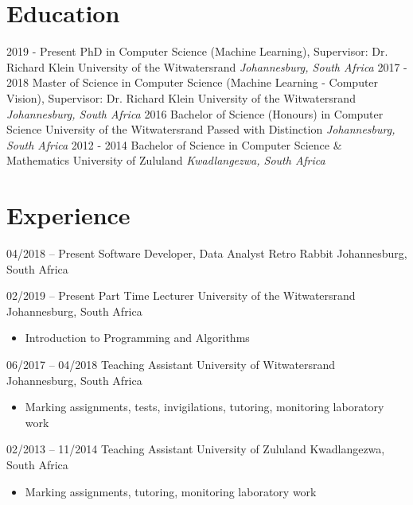 \documentclass[letterpaper]{moderncv}        %
\begin{document}
\makecvtitle

%

\section{Education}
\cventry
{2019 - Present}
{PhD in Computer Science (Machine Learning), Supervisor: Dr. Richard Klein}
{University of the Witwatersrand}
{}
{\textit{Johannesburg, South Africa}}
{}
\cventry
{2017 - 2018}
{Master of Science in Computer Science (Machine Learning - Computer Vision), Supervisor: Dr. Richard Klein}
{University of the Witwatersrand}
{}
{\textit{Johannesburg, South Africa}}
{}
\cventry
{2016}
{Bachelor of Science (Honours) in Computer Science}
{University of the Witwatersrand}
{Passed with Distinction}
{\textit{Johannesburg, South Africa}}
{}
\cventry
{2012 - 2014}
{Bachelor of Science in Computer Science \& Mathematics}
{University of Zululand}
{}
{\textit{Kwadlangezwa, South Africa}}
{}
\section{Experience}

\cventry
{04/2018 -- Present}
{Software Developer, Data Analyst}
{Retro Rabbit}
{Johannesburg, South Africa}
{}
{}

\cventry
{02/2019 -- Present}
{Part Time Lecturer}
{University of the Witwatersrand}
{Johannesburg, South Africa}
{}
{\begin{itemize}%
		\item Introduction to Programming and Algorithms 
	\end{itemize}}

\cventry
{06/2017 -- 04/2018}
{Teaching Assistant}
{University of Witwatersrand}
{Johannesburg, South Africa}
{}
{\begin{itemize}%
	\item Marking assignments, tests, invigilations, tutoring, monitoring laboratory work
	\end{itemize}}
\cventry
{02/2013 -- 11/2014}
{Teaching Assistant}
{University of Zululand}
{Kwadlangezwa, South Africa}
{}
{\begin{itemize}%
	\item Marking assignments, tutoring, monitoring laboratory work
	\end{itemize}}
\end{document}
